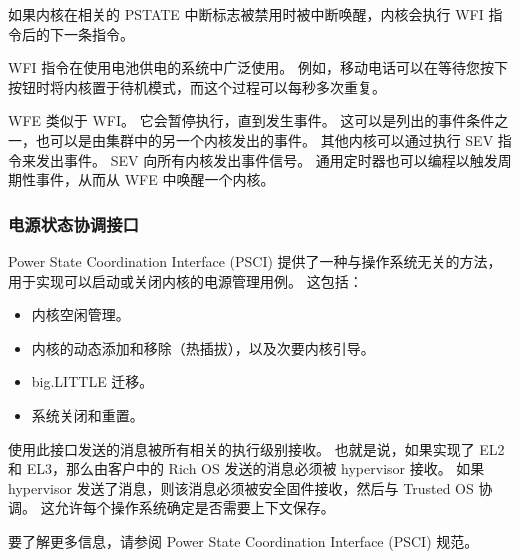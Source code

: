 如果内核在相关的 PSTATE 中断标志被禁用时被中断唤醒，内核会执行 WFI 指令后的下一条指令。

WFI 指令在使用电池供电的系统中广泛使用。
例如，移动电话可以在等待您按下按钮时将内核置于待机模式，而这个过程可以每秒多次重复。

WFE 类似于 WFI。
它会暂停执行，直到发生事件。
这可以是列出的事件条件之一，也可以是由集群中的另一个内核发出的事件。
其他内核可以通过执行 SEV 指令来发出事件。
SEV 向所有内核发出事件信号。
通用定时器也可以编程以触发周期性事件，从而从 WFE 中唤醒一个内核。

\subsubsection{电源状态协调接口}\label{sec:pm-state-coordination-if}

Power State Coordination Interface (PSCI) 提供了一种与操作系统无关的方法，用于实现可以启动或关闭内核的电源管理用例。
这包括：

\begin{itemize}
\item
  内核空闲管理。
\item
  内核的动态添加和移除（热插拔），以及次要内核引导。
\item
  big.LITTLE 迁移。
\item
  系统关闭和重置。
\end{itemize}

使用此接口发送的消息被所有相关的执行级别接收。
也就是说，如果实现了 EL2 和 EL3，那么由客户中的 Rich OS 发送的消息必须被 hypervisor 接收。
如果 hypervisor 发送了消息，则该消息必须被安全固件接收，然后与 Trusted OS 协调。
这允许每个操作系统确定是否需要上下文保存。

要了解更多信息，请参阅 Power State Coordination Interface (PSCI) 规范。

